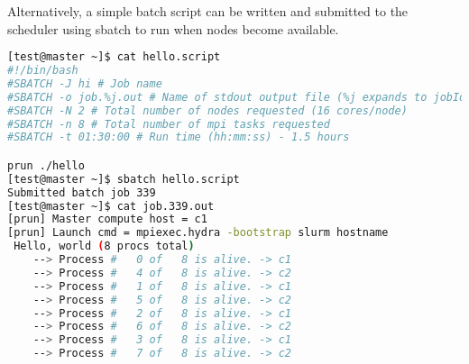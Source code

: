 Alternatively, a simple batch script can be written and submitted to the
scheduler using sbatch to run when nodes become available. 

\begin{lstlisting}[language=bash,keywords={}]
[test@master ~]$ cat hello.script
#!/bin/bash
#SBATCH -J hi # Job name
#SBATCH -o job.%j.out # Name of stdout output file (%j expands to jobId)
#SBATCH -N 2 # Total number of nodes requested (16 cores/node)
#SBATCH -n 8 # Total number of mpi tasks requested
#SBATCH -t 01:30:00 # Run time (hh:mm:ss) - 1.5 hours

prun ./hello
[test@master ~]$ sbatch hello.script
Submitted batch job 339
[test@master ~]$ cat job.339.out
[prun] Master compute host = c1
[prun] Launch cmd = mpiexec.hydra -bootstrap slurm hostname
 Hello, world (8 procs total)
    --> Process #   0 of   8 is alive. -> c1
    --> Process #   4 of   8 is alive. -> c2
    --> Process #   1 of   8 is alive. -> c1
    --> Process #   5 of   8 is alive. -> c2
    --> Process #   2 of   8 is alive. -> c1
    --> Process #   6 of   8 is alive. -> c2
    --> Process #   3 of   8 is alive. -> c1
    --> Process #   7 of   8 is alive. -> c2
\end{lstlisting}


